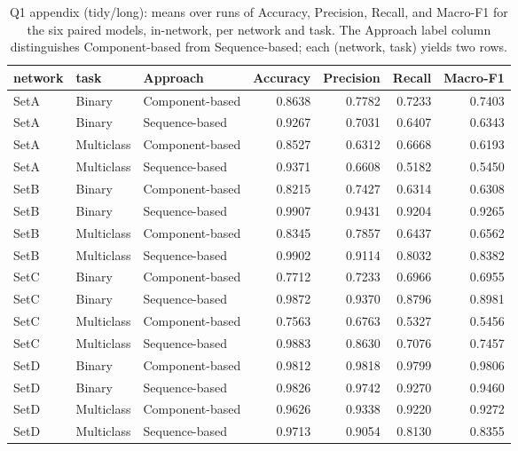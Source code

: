 \begin{table}
\caption{Q1 appendix (tidy/long): means over runs of Accuracy, Precision, Recall, and Macro-F1 for the six paired models, in-network, per network and task. The Approach label column distinguishes Component-based from Sequence-based; each (network, task) yields two rows.}
\label{tab:q1_appendix_per_network}
\begin{tabular}{lllrrrr}
\toprule
network & task & Approach & Accuracy & Precision & Recall & Macro-F1 \\
\midrule
SetA & Binary & Component-based & 0.8638 & 0.7782 & 0.7233 & 0.7403 \\
SetA & Binary & Sequence-based & 0.9267 & 0.7031 & 0.6407 & 0.6343 \\
SetA & Multiclass & Component-based & 0.8527 & 0.6312 & 0.6668 & 0.6193 \\
SetA & Multiclass & Sequence-based & 0.9371 & 0.6608 & 0.5182 & 0.5450 \\
SetB & Binary & Component-based & 0.8215 & 0.7427 & 0.6314 & 0.6308 \\
SetB & Binary & Sequence-based & 0.9907 & 0.9431 & 0.9204 & 0.9265 \\
SetB & Multiclass & Component-based & 0.8345 & 0.7857 & 0.6437 & 0.6562 \\
SetB & Multiclass & Sequence-based & 0.9902 & 0.9114 & 0.8032 & 0.8382 \\
SetC & Binary & Component-based & 0.7712 & 0.7233 & 0.6966 & 0.6955 \\
SetC & Binary & Sequence-based & 0.9872 & 0.9370 & 0.8796 & 0.8981 \\
SetC & Multiclass & Component-based & 0.7563 & 0.6763 & 0.5327 & 0.5456 \\
SetC & Multiclass & Sequence-based & 0.9883 & 0.8630 & 0.7076 & 0.7457 \\
SetD & Binary & Component-based & 0.9812 & 0.9818 & 0.9799 & 0.9806 \\
SetD & Binary & Sequence-based & 0.9826 & 0.9742 & 0.9270 & 0.9460 \\
SetD & Multiclass & Component-based & 0.9626 & 0.9338 & 0.9220 & 0.9272 \\
SetD & Multiclass & Sequence-based & 0.9713 & 0.9054 & 0.8130 & 0.8355 \\
\bottomrule
\end{tabular}
\end{table}
